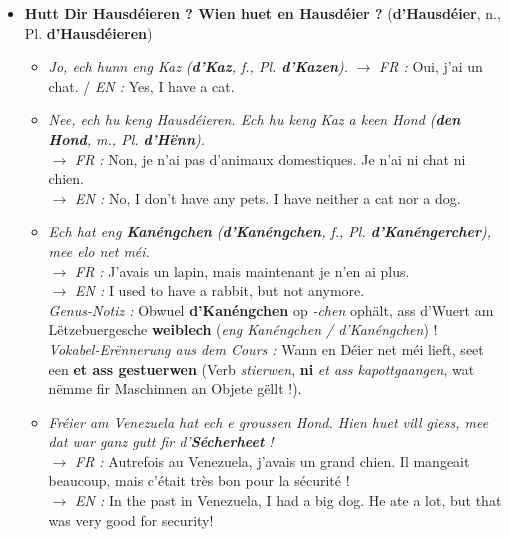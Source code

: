 \begin{itemize}
    \item \textbf{Hutt Dir Hausdéieren ? Wien huet en Hausdéier ?} (\textbf{d'Hausdéier}, n., Pl. \textbf{d'Hausdéieren})
    \begin{itemize}
        \item \textit{Jo, ech hunn eng Kaz (\textbf{d'Kaz}, f., Pl. \textbf{d'Kazen}).} $\rightarrow$ \textit{FR :} Oui, j'ai un chat. / \textit{EN :} Yes, I have a cat.
        \item \textit{Nee, ech hu keng Hausdéieren. Ech hu keng Kaz a keen Hond (\textbf{den Hond}, m., Pl. \textbf{d'Hënn}).} \\
        $\rightarrow$ \textit{FR :} Non, je n'ai pas d'animaux domestiques. Je n'ai ni chat ni chien. \\
        $\rightarrow$ \textit{EN :} No, I don't have any pets. I have neither a cat nor a dog.
        \item \textit{Ech hat eng \textbf{Kanéngchen} (\textbf{d'Kanéngchen}, f., Pl. \textbf{d'Kanéngercher}), mee elo net méi.} \\
        $\rightarrow$ \textit{FR :} J'avais un lapin, mais maintenant je n'en ai plus. \\
        $\rightarrow$ \textit{EN :} I used to have a rabbit, but not anymore. \\
        \textit{Genus-Notiz :} Obwuel \textbf{d'Kanéngchen} op \textit{-chen} ophält, ass d'Wuert am Lëtzebuergesche \textbf{weiblech} (\textit{eng Kanéngchen / d'Kanéngchen}) ! \\
        \textit{Vokabel-Erënnerung aus dem Cours :} Wann en Déier net méi lieft, seet een \textbf{et ass gestuerwen} (Verb \textit{stierwen}, \textbf{ni} \textit{\flqq *et ass kapottgaangen\frqq}, wat nëmme fir Maschinnen an Objete gëllt !).
        \item \textit{Fréier am Venezuela hat ech e groussen Hond. Hien huet vill giess, mee dat war ganz gutt fir d'\textbf{Sécherheet} !} \\
        $\rightarrow$ \textit{FR :} Autrefois au Venezuela, j'avais un grand chien. Il mangeait beaucoup, mais c'était très bon pour la sécurité ! \\
        $\rightarrow$ \textit{EN :} In the past in Venezuela, I had a big dog. He ate a lot, but that was very good for security!
    \end{itemize}

    \vspace{0.4em}


\end{itemize}
